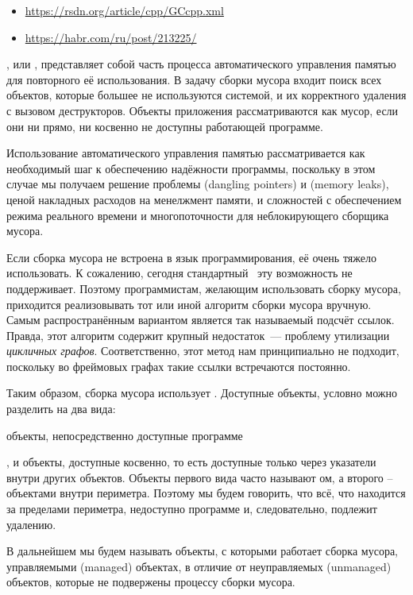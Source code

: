 \label{cppgc}

\begin{itemize}[nosep]
\item
\url{https://rsdn.org/article/cpp/GCcpp.xml}
\item 
\url{https://habr.com/ru/post/213225/}
\end{itemize}

, или ,
представляет собой часть процесса автоматического управления памятью для
повторного её использования. В задачу сборки мусора входит поиск всех объектов,
которые большее не используются системой, и их корректного удаления с вызовом
деструкторов. Объекты приложения рассматриваются как мусор, если они ни прямо,
ни косвенно не доступны работающей программе.

Использование автоматического управления памятью рассматривается как необходимый
шаг к обеспечению надёжности программы, поскольку в этом случае мы получаем
решение проблемы  (dangling pointers) и  (memory leaks), ценой накладных расходов на менелжмент памяти, и
сложностей с обеспечением режима реального времени и многопоточности для
неблокирующего сборщика мусора.

Если сборка мусора не встроена в язык программирования, её очень тяжело
использовать. К сожалению, сегодня стандартный \cpp\ эту возможность не
поддерживает. Поэтому программистам, желающим использовать сборку мусора,
приходится реализовывать тот или иной алгоритм сборки мусора вручную. Самым
распространённым вариантом является так называемый подсчёт ссылок. Правда, этот
алгоритм содержит крупный недостаток\ --- проблему утилизации \emph{цикличных
графов}. Соответственно, этот метод нам принципиально не подходит, поскольку во
фреймовых графах такие ссылки встречаются постоянно.

Таким образом, сборка мусора использует .
Доступные объекты, условно можно разделить на два вида:
\begin{description}[nosep]
\item[периметр] объекты, непосредственно доступные программе
\item[периметр] 
\end{description}
, и объекты, доступные косвенно, то есть
доступные только через указатели внутри других объектов. Объекты первого вида
часто называют ом, а второго – объектами внутри периметра. Поэтому мы
будем говорить, что всё, что находится за пределами периметра, недоступно
программе и, следовательно, подлежит удалению.

В дальнейшем мы будем называть объекты, с которыми работает сборка мусора, управляемыми (managed) объектах, в отличие от неуправляемых (unmanaged) объектов, которые не подвержены процессу сборки мусора.
